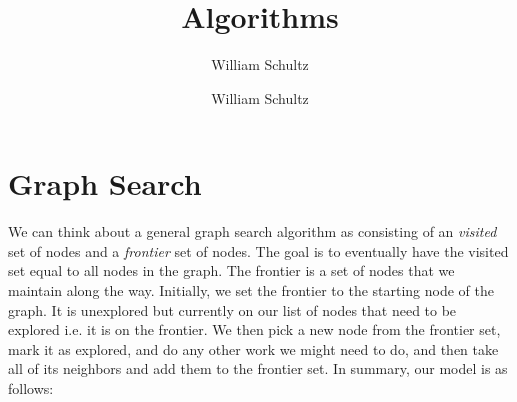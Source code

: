 \documentclass[10pt,a4paper]{article}
\author{William Schultz}
\begin{document}
\title{Algorithms}
\author{William Schultz}
\maketitle

\newcommand{\concept}[1]{\textcolor{blue}{\textit{\textbf{#1}}}}

\section{Graph Search}

We can think about a general graph search algorithm as consisting of an \textit{visited} set of nodes and a \textit{frontier} set of nodes. The goal is to eventually have the visited set equal to all nodes in the graph. The frontier is a set of nodes that we maintain along the way. Initially, we set the frontier to the starting node of the graph. It is unexplored but currently on our list of nodes that need to be explored i.e. it is on the frontier. We then pick a new node from the frontier set, mark it as explored, and do any other work we might need to do, and then take all of its neighbors and add them to the frontier set. In summary, our model is as follows:
\end{document}
